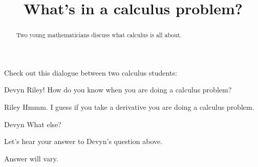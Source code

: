 \documentclass{ximera}
\title[Break-Ground:]{What's in a calculus problem?}
\begin{document}
\begin{abstract}
Two young mathematicians discuss what calculus is all about.
\end{abstract}
\maketitle

Check out this dialogue between two calculus students:

\begin{dialogue}
\item[Devyn] Riley! How do you know when you are doing a calculus problem?
\item[Riley] Hmmm. I guess if you take a derivative you are doing a calculus problem.
\item[Devyn] What else?
\end{dialogue}

\begin{problem}
  Let's hear your answer to Devyn's question above.
  \begin{freeResponse}
    Answer will vary.
  \end{freeResponse}
\end{problem}




\end{document}
